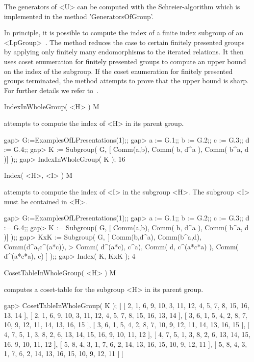 The generators of <U> can be computed with the Schreier-algorithm
which is implemented in the method 'GeneratorsOfGroup'.


In principle, it is possible to compute the index of a finite index
subgroup of an <LpGroup>~\cite{Har10}. The method reduces the case
to certain finitely presented groups by applying only finitely many
endomorphisms to the iterated relations. It then uses coset enumeration
for finitely presented groups to compute an upper bound on the index
of the subgroup.  If the coset enumeration for finitely presented
groups terminated, the method attempts to prove that the upper bound is
sharp. For further details we refer to~\cite{Har10}.

\> IndexInWholeGroup( <H> ) M

attempts to compute the index of <H> in its parent group. 

\beginexample
gap> G:=ExamplesOfLPresentations(1);;
gap> a := G.1;; b := G.2;; c := G.3;; d := G.4;;
gap> K := Subgroup( G, [ Comm(a,b), Comm( b, d^a ), Comm( b^a, d )] );;
gap> IndexInWholeGroup( K );
16
\endexample

\> Index( <H>, <I> ) M

attempts to compute the index of <I> in the subgroup <H>. The subgroup
<I> must be contained in <H>.

\beginexample
gap> G:=ExamplesOfLPresentations(1);;
gap> a := G.1;; b := G.2;; c := G.3;; d := G.4;;
gap> K := Subgroup( G, [ Comm(a,b), Comm( b, d^a ), Comm( b^a, d )] );;
gap> KxK := Subgroup( G, [ Comm(b,d^a), Comm(b^a,d), Comm(d^a,c^(a*c)),                         
> Comm( d^(a*c), c^a), Comm( d, c^(a*c*a) ), Comm( d^(a*c*a), c) ] );;
gap> Index( K, KxK );
4
\endexample

\> CosetTableInWholeGroup( <H> ) M

computes a coset-table for the subgroup <H> in its parent group.

\beginexample
gap> CosetTableInWholeGroup( K );
[ [ 2, 1, 6, 9, 10, 3, 11, 12, 4, 5, 7, 8, 15, 16, 13, 14 ],
  [ 2, 1, 6, 9, 10, 3, 11, 12, 4, 5, 7, 8, 15, 16, 13, 14 ],
  [ 3, 6, 1, 5, 4, 2, 8, 7, 10, 9, 12, 11, 14, 13, 16, 15 ],
  [ 3, 6, 1, 5, 4, 2, 8, 7, 10, 9, 12, 11, 14, 13, 16, 15 ],
  [ 4, 7, 5, 1, 3, 8, 2, 6, 13, 14, 15, 16, 9, 10, 11, 12 ],
  [ 4, 7, 5, 1, 3, 8, 2, 6, 13, 14, 15, 16, 9, 10, 11, 12 ],
  [ 5, 8, 4, 3, 1, 7, 6, 2, 14, 13, 16, 15, 10, 9, 12, 11 ],
  [ 5, 8, 4, 3, 1, 7, 6, 2, 14, 13, 16, 15, 10, 9, 12, 11 ] ]
\endexample

